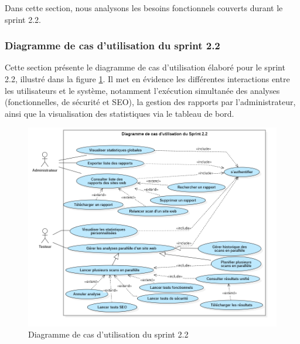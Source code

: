 Dans cette section, nous analysons les besoins fonctionnels couverts durant le sprint 2.2.
\subsubsection{Diagramme de cas d’utilisation du sprint 2.2}
Cette section présente le diagramme de cas d’utilisation élaboré pour le sprint 2.2, illustré dans la figure \ref{fig:caseS22}. Il met en évidence les différentes interactions entre les utilisateurs et le système, notamment l’exécution simultanée des analyses (fonctionnelles, de sécurité et SEO), la gestion des rapports par l’administrateur, ainsi que la visualisation des statistiques via le tableau de bord.
\begin{figure}[H]
    \centering
    \includegraphics[width=\linewidth]{chapitres/ch4Sp2/section/sprint2.2/img/LastUseCaseSprint2.2.png}
    \caption{Diagramme de cas d'utilisation du sprint 2.2}
    \label{fig:caseS22}
\end{figure}
\vspace{-0.3cm}

